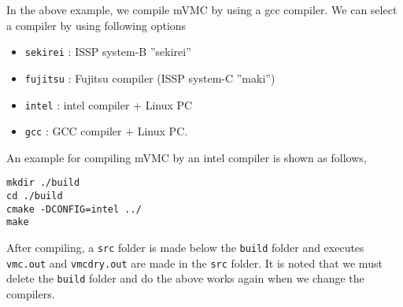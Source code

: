 In the above example, we compile mVMC by using a gcc compiler. 
We can select a compiler by using following options
\begin{itemize}
\item \verb|sekirei| : ISSP system-B ''sekirei''
\item \verb|fujitsu| : Fujitsu compiler (ISSP system-C ''maki'')
\item \verb|intel| : intel compiler + Linux PC
\item \verb|gcc| : GCC compiler + Linux PC.
\end{itemize}
An example for compiling mVMC by an intel compiler is shown as follows, 
\begin{verbatim}
mkdir ./build
cd ./build
cmake -DCONFIG=intel ../
make
\end{verbatim}
After compiling,  a \verb|src| folder is made below the \verb|build| folder and executes
\verb|vmc.out| and \verb|vmcdry.out| are made in the  \verb|src| folder. 
It is noted that  we must delete the  \verb|build| folder and do the above works again 
when we change the compilers.

\label{Sec:HowToInstall}

